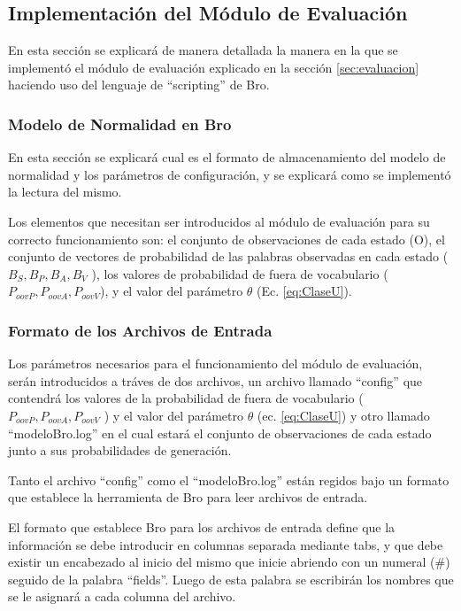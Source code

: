 \subsection{Implementación del Módulo de Evaluación}

En esta sección se explicará de manera detallada la manera en la que se implementó el módulo de evaluación explicado en la sección \ref{sec:evaluacion}  haciendo uso del lenguaje de ``scripting'' de Bro.
    
\subsubsection{Modelo de Normalidad en Bro}
\label{sec:lecturaModelo}

En esta sección se explicará cual es el formato de almacenamiento del
modelo de normalidad y los parámetros de configuración, y se explicará como
se implementó la lectura del mismo.

Los elementos que necesitan ser introducidos al módulo de evaluación para su correcto funcionamiento son: el conjunto de observaciones de cada estado (O), el conjunto de vectores de probabilidad de las palabras observadas en cada estado ( $B_{S}, B_{P}, B_{A}, B_{V}$ ), los
valores de probabilidad de fuera de vocabulario ($P_{oovP}, P_{oovA}, P_{oovV}$), y el valor del parámetro $\theta$ (Ec. \ref{eq:ClaseU}).

\subsubsection*{Formato de los Archivos de Entrada}

    Los parámetros necesarios para el funcionamiento del módulo de evaluación, serán introducidos a tráves de dos archivos, un archivo llamado
``config'' que contendrá los valores de la probabilidad de fuera de vocabulario ($P_{oovP}, P_{oovA}, P_{oovV}$ ) y el valor del parámetro $\theta$ (ec. \ref{eq:ClaseU}) y otro llamado
``modeloBro.log'' en el cual estará el conjunto de observaciones de cada estado junto a sus probabilidades de generación.
   
Tanto el archivo ``config'' como el ``modeloBro.log'' están regidos bajo un formato que establece la herramienta de Bro para leer archivos de entrada.

El formato que establece Bro para los archivos de entrada define que la información se debe introducir en columnas separada mediante tabs, y que debe existir un encabezado al inicio del mismo que inicie abriendo con un numeral (\#) seguido de la palabra ``fields''. Luego de esta palabra se escribirán los nombres que se le asignará a cada columna del archivo.

